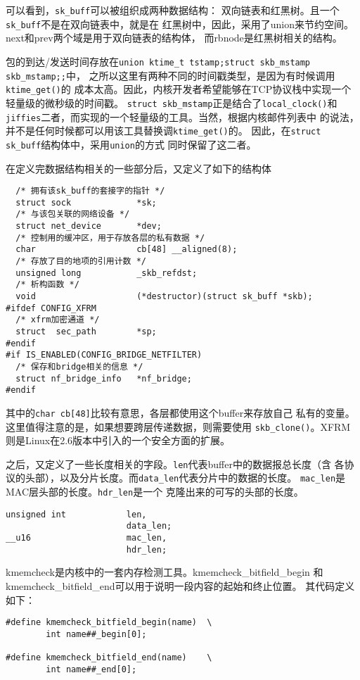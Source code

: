 可以看到，\texttt{sk_buff}可以被组织成两种数据结构：
双向链表和红黑树。且一个\texttt{sk_buff}不是在双向链表中，就是在
红黑树中，因此，采用了union来节约空间。next和prev两个域是用于双向链表的结构体，
而rbnode是红黑树相关的结构。

包的到达/发送时间存放在\texttt{union {ktime_t tstamp;struct skb_mstamp skb_mstamp;};}中，
之所以这里有两种不同的时间戳类型，是因为有时候调用\texttt{ktime_get()}的
成本太高。因此，内核开发者希望能够在TCP协议栈中实现一个轻量级的微秒级的时间戳。
\texttt{struct skb_mstamp}正是结合了\texttt{local_clock()}和
\texttt{jiffies}二者，而实现的一个轻量级的工具。当然，根据内核邮件列表中
的说法，并不是任何时候都可以用该工具替换调\texttt{ktime_get()}的。
因此，在\texttt{struct sk_buff}结构体中，采用\texttt{union}的方式
同时保留了这二者。

在定义完数据结构相关的一些部分后，又定义了如下的结构体
\begin{verbatim}
  /* 拥有该sk_buff的套接字的指针 */
  struct sock             *sk;
  /* 与该包关联的网络设备 */
  struct net_device       *dev;
  /* 控制用的缓冲区，用于存放各层的私有数据 */
  char                    cb[48] __aligned(8);
  /* 存放了目的地项的引用计数 */
  unsigned long           _skb_refdst;
  /* 析构函数 */
  void                    (*destructor)(struct sk_buff *skb);
#ifdef CONFIG_XFRM
  /* xfrm加密通道 */
  struct  sec_path        *sp;
#endif
#if IS_ENABLED(CONFIG_BRIDGE_NETFILTER)
  /* 保存和bridge相关的信息 */
  struct nf_bridge_info   *nf_bridge;
#endif
\end{verbatim}

其中的\texttt{char cb[48]}比较有意思，各层都使用这个buffer来存放自己
私有的变量。这里值得注意的是，如果想要跨层传递数据，则需要使用
\texttt{skb_clone()}。XFRM则是Linux在2.6版本中引入的一个安全方面的扩展。

之后，又定义了一些长度相关的字段。\texttt{len}代表buffer中的数据报总长度（含
各协议的头部），以及分片长度。而\texttt{data_len}代表分片中的数据的长度。
\texttt{mac_len}是MAC层头部的长度。\texttt{hdr_len}是一个
克隆出来的可写的头部的长度。
\begin{verbatim}
unsigned int            len,
                        data_len;
__u16                   mac_len,
                        hdr_len;
\end{verbatim}

kmemcheck是内核中的一套内存检测工具。kmemcheck\_bitfield\_begin
和kmemcheck\_bitfield\_end可以用于说明一段内容的起始和终止位置。
其代码定义如下：
\begin{verbatim}
#define kmemcheck_bitfield_begin(name)  \
        int name##_begin[0];

#define kmemcheck_bitfield_end(name)    \
        int name##_end[0];
\end{verbatim}

